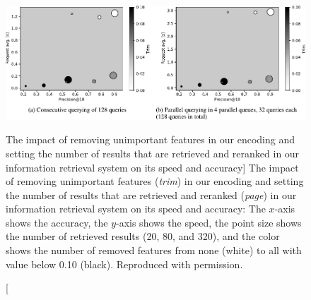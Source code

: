 \begin{figure}
\includegraphics{scaletext-speed}
\vspace{-0.5cm}
\caption
  [The impact of removing unimportant features in our encoding and setting the
   number of results that are retrieved and reranked in our information
   retrieval system on its speed and accuracy]%
  {The impact of removing unimportant features (\emph{trim}) in our encoding and
   setting the number of results that are retrieved and reranked (\emph{page}) in
   our information retrieval system on its speed and accuracy: The
   $x$-axis shows the accuracy, the $y$-axis shows the speed, the point size
   shows the number of retrieved results (20, 80, and 320), and the color shows
   the number of removed features from none (white) to all with value below 0.10
   (black). Reproduced with permission.
   \cite[Figure 2]{rygl2017semantic}}
\protect{}
\label{fig:dense-retrieval-in-inverted-indices-speed}
\end{figure}
